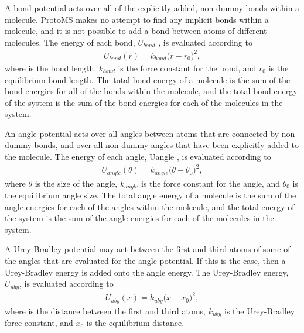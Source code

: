 \documentclass[letterpaper,10pt,english]{sphinxmanual}
\begin{document}
A bond potential acts over all of the explicitly added, non-dummy bonds within a molecule. ProtoMS makes no attempt to find any implicit bonds within a molecule, and it is not possible to add a bond between atoms of different molecules. The energy of each bond, \(U_{bond}\) , is evaluated according to
\begin{equation}\label{equation:protoms:bondpot}
\begin{split}U_{bond}(r) = k_{bond}\bigl(r-r_0\bigr)^2,\end{split}
\end{equation}
where  is the bond length, \(k_{bond}\) is the force constant for the bond, and \(r_0\) is the equilibrium bond length. The total bond energy of a molecule is the sum of the bond energies for all of the bonds within the molecule, and the total bond energy of the system is the sum of the bond energies for each of the molecules in the system.

\ignorespaces 
{}

An angle potential acts over all angles between atoms that are connected by non-dummy bonds, and over all
non-dummy angles that have been explicitly added to the molecule. The energy of each angle, Uangle , is evaluated
according to
\begin{equation}\label{equation:protoms:angpot}
\begin{split}U_{angle}(\theta) = k_{angle}\bigl(\theta-\theta_0\bigr)^2,\end{split}
\end{equation}
where \(\theta\) is the size of the angle, \(k_{angle}\) is the force constant for the angle, and \(\theta_0\) is the equilibrium angle size. The total angle energy of a molecule is the sum of the angle energies for each of the angles within the molecule, and the total energy of the system is the sum of the angle energies for each of the molecules in the system.

\ignorespaces 
{}

A Urey-Bradley potential may act between the first and third atoms of some of the angles that are evaluated for the angle potential. If this is the case, then a Urey-Bradley energy is added onto the angle energy. The Urey-Bradley energy, \(U_{uby}\), is evaluated according to
\begin{equation}\label{equation:protoms:ubpot}
\begin{split}U_{uby}(x) = k_{uby}\bigl(x-x_0\bigr)^2,\end{split}
\end{equation}
where  is the distance between the first and third atoms, \(k_{uby}\) is the Urey-Bradley force constant, and \(x_0\) is the equilibrium distance.
\end{document}
